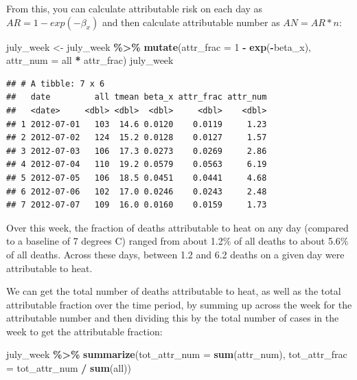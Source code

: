\documentclass[
]{book}
\newenvironment{Shaded}{\begin{snugshade}}{\end{snugshade}}
\newcommand{\AttributeTok}[1]{\textcolor[rgb]{0.13,0.29,0.53}{#1}}
\newcommand{\DecValTok}[1]{\textcolor[rgb]{0.00,0.00,0.81}{#1}}
\newcommand{\FunctionTok}[1]{\textcolor[rgb]{0.13,0.29,0.53}{\textbf{#1}}}
\newcommand{\NormalTok}[1]{#1}
\newcommand{\OtherTok}[1]{\textcolor[rgb]{0.56,0.35,0.01}{#1}}
\newcommand{\SpecialCharTok}[1]{\textcolor[rgb]{0.81,0.36,0.00}{\textbf{#1}}}
\begin{document}
From this, you can calculate attributable risk on each day as \(AR = 1 - exp(-\beta_x)\) and then calculate attributable number as \(AN = AR * n\):

\begin{Shaded}
\begin{Highlighting}[]
\NormalTok{july\_week }\OtherTok{\textless{}{-}}\NormalTok{ july\_week }\SpecialCharTok{\%\textgreater{}\%} 
  \FunctionTok{mutate}\NormalTok{(}\AttributeTok{attr\_frac =} \DecValTok{1} \SpecialCharTok{{-}} \FunctionTok{exp}\NormalTok{(}\SpecialCharTok{{-}}\NormalTok{beta\_x),}
         \AttributeTok{attr\_num =}\NormalTok{ all }\SpecialCharTok{*}\NormalTok{ attr\_frac)}
\NormalTok{july\_week}
\end{Highlighting}
\end{Shaded}

\begin{verbatim}
## # A tibble: 7 x 6
##   date         all tmean beta_x attr_frac attr_num
##   <date>     <dbl> <dbl>  <dbl>     <dbl>    <dbl>
## 1 2012-07-01   103  14.6 0.0120    0.0119     1.23
## 2 2012-07-02   124  15.2 0.0128    0.0127     1.57
## 3 2012-07-03   106  17.3 0.0273    0.0269     2.86
## 4 2012-07-04   110  19.2 0.0579    0.0563     6.19
## 5 2012-07-05   106  18.5 0.0451    0.0441     4.68
## 6 2012-07-06   102  17.0 0.0246    0.0243     2.48
## 7 2012-07-07   109  16.0 0.0160    0.0159     1.73
\end{verbatim}

Over this week, the fraction of deaths attributable to heat on any day (compared to a baseline of 7 degrees C) ranged from about 1.2\% of all deaths to about 5.6\% of all deaths. Across these days, between 1.2 and 6.2 deaths on a given day were attributable to heat.

We can get the total number of deaths attributable to heat, as well as the total attributable fraction over the time period, by summing up across the week for the attributable number and then dividing this by the total number of cases in the week to get the attributable fraction:

\begin{Shaded}
\begin{Highlighting}[]
\NormalTok{july\_week }\SpecialCharTok{\%\textgreater{}\%} 
  \FunctionTok{summarize}\NormalTok{(}\AttributeTok{tot\_attr\_num =} \FunctionTok{sum}\NormalTok{(attr\_num), }
            \AttributeTok{tot\_attr\_frac =}\NormalTok{ tot\_attr\_num }\SpecialCharTok{/} \FunctionTok{sum}\NormalTok{(all))}
\end{Highlighting}
\end{Shaded}
\end{document}
